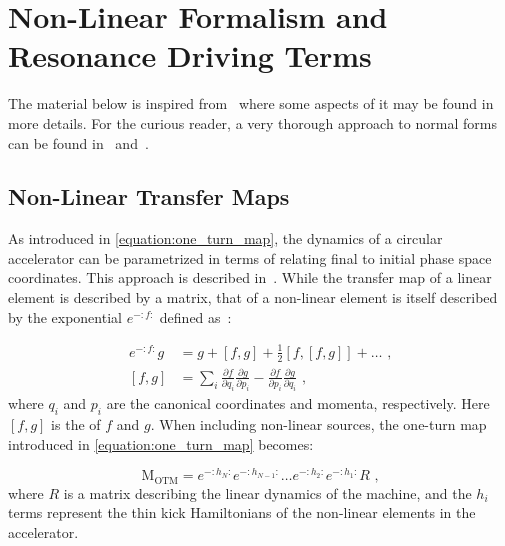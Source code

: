 \section{Non-Linear Formalism and Resonance Driving Terms}
\label{section:non_linear_formalism_and_rdts}

The material below is inspired from~\cite{PHD:Tomas, PHD:Franchi,PHD:Maclean, PHD:Persson} where some aspects of it may be found in more details.
For the curious reader, a very thorough approach to normal forms can be found in~\cite{PHD:Carlier} and~\cite{PRAB:Franchi:First_Simultaneous}.

\subsection{Non-Linear Transfer Maps}
\label{subsection:non_linear_transfer_maps}

As introduced in \cref{equation:one_turn_map}, the dynamics of a circular accelerator can be parametrized in terms of  relating final to initial phase space coordinates.
This approach is described in~\cite{BOOK:Bazzani:Normal_Form_Approach_Betatron_Motion, JMP:Forest:Hamiltonian_Free_Description_Single_Particle_Dynamics}.
While the transfer map of a linear element is described by a matrix, that of a non-linear element is itself described by the exponential  \(e^{-:f:}\) defined as~\cite{BOOK:Wolski:Beam_dynamics}:

\begin{equation}
    \begin{aligned}
        e^{-:f:} g          &= g + \left[f, g\right] + \frac{1}{2} \left[f, \left[f, g \right] \right] + \ldots \text{ ,} \\
        \left[ f, g \right] &= \sum_i \frac{\partial f}{\partial q_i} \frac{\partial g}{\partial p_i} - \frac{\partial f}{\partial p_i} \frac{\partial g}{\partial q_i} \text{ ,}
    \end{aligned}
    \label{equation:lie_operator}
\end{equation}
where \(q_i\) and \(p_i\) are the canonical coordinates and momenta, respectively.
Here \(\left[ f, g \right]\) is the  of \(f\) and \(g\).
When including non-linear sources, the one-turn map introduced in \cref{equation:one_turn_map} becomes:

\begin{equation}
    \mathrm{M_{OTM}} =e^{-:h_N:} e^{-:h_{N-1}:} \ldots e^{-:h_2:} e^{-:h_1:} R \text{ ,}
    \label{equation:one_turn_map_non_linear}
\end{equation}
where \(R\) is a matrix describing the linear dynamics of the machine, and the \(h_i\) terms represent the thin kick Hamiltonians of the non-linear elements in the accelerator.
\break


